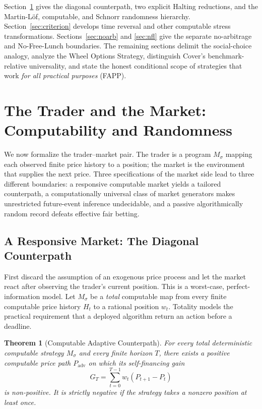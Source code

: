 \documentclass[aps,pra,reprint,superscriptaddress,amsmath,amssymb,floatfix]{revtex4-2}
\theoremstyle{plain}
\newtheorem{theorem}{Theorem}
\theoremstyle{definition}
\theoremstyle{remark}
\begin{document}
Section~\ref{sec:computability} gives the diagonal counterpath, two explicit
Halting reductions, and the Martin-L\"of, computable, and Schnorr randomness
hierarchy. Section~\ref{sec:criterion} develops time reversal and other
computable stress transformations. Sections~\ref{sec:noarb} and
\ref{sec:nfl} give the separate no-arbitrage and No-Free-Lunch boundaries.
The remaining sections delimit the social-choice analogy, analyze the Wheel
Options Strategy, distinguish Cover's benchmark-relative universality, and
state the honest conditional scope of strategies that work \emph{for all
practical purposes} (FAPP).

\section{The Trader and the Market: Computability and Randomness}
\label{sec:computability}

We now formalize the trader--market pair. The trader is a program
\(M_\sigma\) mapping each observed finite price history to a position; the
market is the environment that supplies the next price. Three specifications
of the market side lead to three different boundaries: a responsive computable
market yields a tailored counterpath, a computationally universal class of
market generators makes unrestricted future-event inference undecidable, and
a passive algorithmically random record defeats effective fair betting.

\subsection{A Responsive Market: The Diagonal Counterpath}

First discard the assumption of an exogenous price process and let the market
react after observing the trader's current position. This is a worst-case,
perfect-information model. Let \(M_\sigma\) be a \emph{total} computable map
from every finite computable price history \(H_t\) to a rational position
\(w_t\). Totality models the practical requirement that a deployed algorithm
return an action before a deadline.

\begin{theorem}[Computable Adaptive Counterpath]
  \label{thm:counterpath}
  For every total deterministic computable strategy \(M_\sigma\) and every
  finite horizon \(T\), there exists a positive computable price path
  \(P_{\mathrm{adv}}\) on which its self-financing gain
  \[
    G_T=\sum_{t=0}^{T-1}w_t(P_{t+1}-P_t)
  \]
  is non-positive. It is strictly negative if the strategy takes a nonzero
  position at least once.
\end{theorem}
\end{document}
